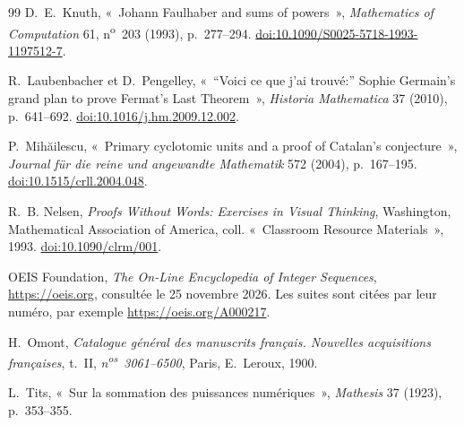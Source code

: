 \documentclass[11pt,a4paper]{article}
\theoremstyle{remark}
\begin{document}
{\begin{thebibliography}{99}
D.~E.~Knuth, «~Johann Faulhaber and sums of powers~», \emph{Mathematics of
Computation} 61, n\textsuperscript{o}~203 (1993), p.~277--294.
\href{https://doi.org/10.1090/S0025-5718-1993-1197512-7}{doi:10.1090/S0025-5718-1993-1197512-7}.

R.~Laubenbacher et D.~Pengelley, «~“Voici ce que j'ai trouvé:” Sophie
Germain's grand plan to prove Fermat's Last Theorem~», \emph{Historia
Mathematica} 37 (2010), p.~641--692.
\href{https://doi.org/10.1016/j.hm.2009.12.002}{doi:10.1016/j.hm.2009.12.002}.

P.~Mihăilescu, «~Primary cyclotomic units and a proof of Catalan's
conjecture~», \emph{Journal für die reine und angewandte Mathematik} 572
(2004), p.~167--195.
\href{https://doi.org/10.1515/crll.2004.048}{doi:10.1515/crll.2004.048}.

R.~B. Nelsen, \emph{Proofs Without Words: Exercises in Visual Thinking},
Washington, Mathematical Association of America, coll. «~Classroom Resource
Materials~», 1993. \href{https://doi.org/10.1090/clrm/001}{doi:10.1090/clrm/001}.

OEIS Foundation, \emph{The On-Line Encyclopedia of Integer Sequences},
\url{https://oeis.org}, consultée le 25 novembre 2026. Les suites sont
citées par leur numéro, par exemple \url{https://oeis.org/A000217}.

H.~Omont, \emph{Catalogue général des manuscrits français. Nouvelles
acquisitions françaises}, t.~II, \emph{n\textsuperscript{os}~3061--6500}, Paris, E.~Leroux, 1900.


L.~Tits, «~Sur la sommation des puissances numériques~», \emph{Mathesis} 37
(1923), p.~353--355.

\end{thebibliography}}
\end{document}
